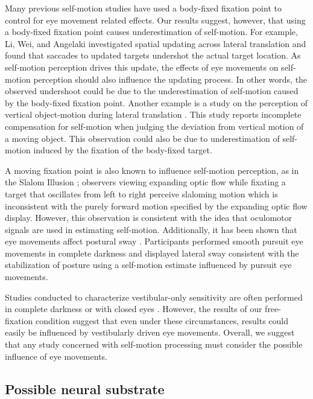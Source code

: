 Many previous self-motion studies have used a body-fixed fixation point to control for eye movement related effects. Our results suggest, however, that using a body-fixed fixation point causes underestimation of self-motion. For example, Li, Wei, and Angelaki \citeyear{li2005a} investigated spatial updating across lateral translation and found that saccades to updated targets undershot the actual target location. As self-motion perception drives this update, the effects of eye movements on self-motion perception should also influence the updating process. In other words, the observed undershoot could be due to the underestimation of self-motion caused by the body-fixed fixation point. Another example is a study on the perception of vertical object-motion during lateral translation \cite{dokka2013}. This study reports incomplete compensation for self-motion when judging the deviation from vertical motion of a moving object. This observation could also be due to underestimation of self-motion induced by the fixation of the body-fixed target.

A moving fixation point is also known to influence self-motion perception, as in the Slalom Illusion \cite{freeman2000}; observers viewing expanding optic flow while fixating a target that oscillates from left to right perceive slaloming motion which is inconsistent with the purely forward motion specified by the expanding optic flow display. However, this observation is consistent with the idea that oculomotor signals are used in estimating self-motion. Additionally, it has been shown that eye movements affect postural sway \cite{glasauer2005}.  Participants performed smooth pursuit eye movements in complete darkness and displayed lateral sway consistent with the stabilization of posture using a self-motion estimate influenced by pursuit eye movements.

Studies conducted to characterize vestibular-only sensitivity are often performed in complete darkness or with closed eyes \cite{grabherr2008,  macneilage2010b, macneilage2010a, roditi2012, valko2012, nesti2014}. However, the results of our free-fixation condition suggest that even under these circumstances, results could easily be influenced by vestibularly driven eye movements. Overall, we suggest that any study concerned with self-motion processing must consider the possible influence of eye movements.

\subsection{Possible neural substrate}


